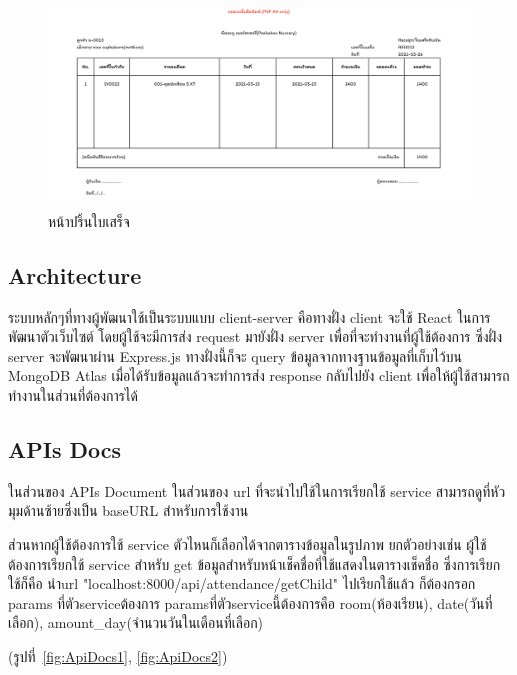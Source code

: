 \begin{itemize}
    \begin{figure}
      \begin{center}
      \includegraphics[width=\linewidth]{images/slipPage.png}
      \end{center}
      \caption[หน้าปริ้นใบเสร็จ]{หน้าปริ้นใบเสร็จ}
      \label{fig:slipPage}
      \end{figure}
\end{itemize}

\subsection{Architecture}

ระบบหลักๆที่ทางผู้พัฒนาใช้เป็นระบบแบบ client-server คือทางฝั่ง client จะใช้ React ในการพัฒนาตัวเว็บไซต์ โดยผู้ใช้จะมีการส่ง request มายังฝั่ง server เพื่อที่จะทำงานที่ผู้ใช้ต้องการ ซึ่งฝั่ง server 
จะพัฒนาผ่าน Express.js ทางฝั่งนี้ก็จะ query ข้อมูลจากทางฐานข้อมูลที่เก็บไว้บน MongoDB Atlas เมื่อได้รับข้อมูลแล้วจะทำการส่ง response กลับไปยัง client เพื่อให้ผู้ใช้สามารถทำงานในส่วนที่ต้องการได้

\subsection{APIs Docs}
ในส่วนของ APIs Document ในส่วนของ url ที่จะนำไปใช้ในการเรียกใช้ service สามารถดูที่หัวมุมด้านซ้ายซึ่งเป็น baseURL สำหรับการใช้งาน

ส่วนหากผู้ใช้ต้องการใช้ service ตัวไหนก็เลือกได้จากตารางข้อมูลในรูปภาพ ยกตัวอย่างเช่น ผู้ใช้ต้องการเรียกใช้ service สำหรับ get ข้อมูลสำหรับหน้าเช็คชื่อที่ใช้แสดงในตารางเช็คชื่อ
ซึ่งการเรียกใช้ก็คือ นำurl "localhost:8000/api/attendance/getChild" ไปเรียกใช้แล้ว ก็ต้องกรอก params ที่ตัวserviceต้องการ paramsที่ตัวserviceนี้ต้องการคือ room(ห้องเรียน), date(วันที่เลือก), amount\_day(จำนวนวันในเดือนที่เลือก)

(รูปที่~\ref{fig:ApiDocs1}, \ref{fig:ApiDocs2})

